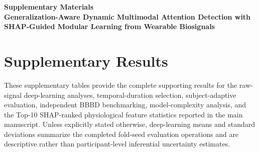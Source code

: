 \documentclass[11pt,a4paper]{article}
\begin{document}
\begin{center}
{\Large\bfseries Supplementary Materials}\\[8pt]
{\large\bfseries Generalization-Aware Dynamic Multimodal Attention Detection with SHAP-Guided Modular Learning from Wearable Biosignals}
\end{center}

\vspace{8pt}

\section*{Supplementary Results}

These supplementary tables provide the complete supporting results for the raw-signal deep-learning analyses, temporal-duration selection, subject-adaptive evaluation, independent BBBD benchmarking, model-complexity analysis, and the Top-10 SHAP-ranked physiological feature statistics reported in the main manuscript. Unless explicitly stated otherwise, deep-learning means and standard deviations summarize the completed fold-seed evaluation operations and are descriptive rather than participant-level inferential uncertainty estimates.



\clearpage


\clearpage


\clearpage


\clearpage


\clearpage


\clearpage


\clearpage


\clearpage

\end{document}
